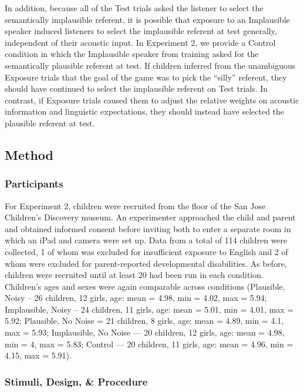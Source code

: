 \documentclass[man,floatsintext]{apa6}
\begin{document}
In addition, because all of the Test trials asked the listener to select the semantically implausible referent, it is possible that exposure to an Implausible speaker induced listeners to select the implausible referent at test generally, independent of their acoustic input.  In Experiment 2, we provide a Control condition in which the Implausible speaker from training asked for the semantically plausible referent at test. If children inferred from the unambiguous Exposure trials that the goal of the game was to pick the ``silly'' referent, they should have continued to select the implausible referent on Test trials. In contrast, if Exposure trials caused them to adjust the relative weights on acoustic information and linguistic expectations, they should instead have selected the plausible referent at test.

\subsection{Method}

\subsubsection{Participants}

For Experiment 2, children were recruited from the floor of the San Jose Children's Discovery museum. An experimenter approached the child and parent and obtained informed consent before inviting both to enter a separate room in which an iPad and camera were set up. Data from a total of 114 children were collected, 1 of whom was excluded for insufficient exposure to English and 2 of whom were excluded for parent-reported developmental disabilities. As before, children were recruited until at least 20 had been run in each condition. Children's ages and sexes were again comparable across conditions (Plausible, Noisy -- 26 children, 12 girls, age: mean = 4.98, min = 4.02, max = 5.94; Implausible, Noisy -- 24 children, 11 girls, age: mean = 5.01, min = 4.01, max = 5.92; Plausible, No Noise = 21 children, 8 girls, age: mean = 4.89, min = 4.1, max = 5.93; Implausible, No Noise --- 20 children, 12 girls, age: mean = 4.98, min = 4, max = 5.83; Control --- 20 children, 11 girls, age: mean = 4.96, min = 4.15, max = 5.91).
 
\subsubsection{Stimuli, Design, \& Procedure}
\end{document}
